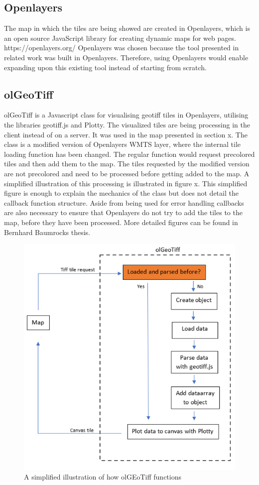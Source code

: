 \subsection*{Openlayers}
The map in which the tiles are being showed are created in Openlayers, which is an open source JavaScript library for creating dynamic maps for web pages. 
https://openlayers.org/
Openlayers was chosen because the tool presented in related work was built in Openlayers. Therefore, using Openlayers would enable expanding upon this existing tool instead of starting from scratch. 

\subsection*{olGeoTiff}
olGeoTiff is a Javascript class for visualising geotiff tiles in Openlayers, utilising the libraries geotiff.js and Plotty. The visualized tiles are being processing in the client instead of on a server. It was used in the map presented in section x. 
The class is a modified version of Openlayers WMTS layer, where the internal tile loading function has been changed. The regular function would request precolored tiles and then add them to the map. The tiles requested by the modified version are not precolored and need to be processed before getting added to the map. A simplified illustration of this processing is illustrated in figure x. This simplified figure is enough to explain the mechanics of the class but does not detail the callback function structure. Aside from being used for error handling callbacks are also necessary to ensure that Openlayers do not try to add the tiles to the map, before they have been processed. More detailed figures can be found in Bernhard Baumrocks thesis.
 
 \begin{figure} [H]
 	\centering
 	\includegraphics[width=.8\textwidth]{Pictures/olGeoTiffSimplified}
 	\caption{A simplified illustration of how olGEoTiff functions}
 	\label{olGeoTiffSimplified}
 \end{figure}
 
